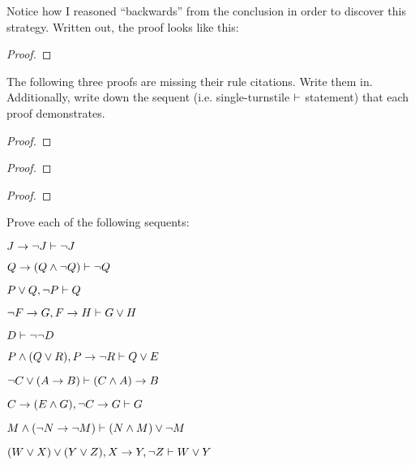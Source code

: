 Notice how I reasoned ``backwards'' from the conclusion in order to discover this strategy.  Written out, the proof looks like this:


\begin{proof}
  
\open
	 
	\open
		 
		 
		 
	\close
	 
\close
{} 
\end{proof}



\practiceproblems
\problempart
The following three proofs are missing their rule citations. Write them in. Additionally, write down the sequent (i.e. single-turnstile $\vdash$ statement) that each proof demonstrates.
\begin{multicols}{2}
\begin{proof}
\end{proof}

\begin{proof}
\open
\close
{}%
\end{proof}

\begin{proof}
\open
\close
\open
\close
{}%
\end{proof}
\end{multicols}

\problempart
Prove each of the following sequents:
\begin{earg}
\item $J\rightarrow\neg J \vdash \neg J$
\item $Q\rightarrow(Q\wedge\neg Q) \vdash \neg Q$
\item $P \vee Q, \neg P \vdash Q$
\item $\neg F\rightarrow G, F\rightarrow H \vdash G\vee H$
\item $D \vdash \neg \neg D$
\item $P \wedge (Q\vee R), P\rightarrow \neg R \vdash Q\vee E$
\item $\neg C \vee (A \rightarrow B) \vdash (C \wedge A) \rightarrow B$
\item $C\rightarrow(E\wedge G), \neg C \rightarrow G \vdash G$
\item $M \wedge (\neg N \rightarrow \neg M) \vdash (N \wedge M) \vee \neg M$
\item $(W \vee X) \vee (Y \vee Z), X\rightarrow Y, \neg Z \vdash W\vee Y$


\end{earg}




